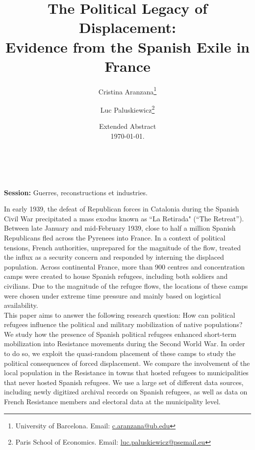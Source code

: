 





\title{\centering The Political Legacy of Displacement: \\ Evidence from the Spanish Exile in France}
\author{
Cristina Aranzana\footnote{University of Barcelona. Email: \href{mailto:c.aranzana@ub.edu}{c.aranzana@ub.edu}} \and
Luc Paluskiewicz\footnote{Paris School of Economics. Email: \href{mailto:luc.paluskiewicz@psemail.eu}{luc.paluskiewicz@psemail.eu}}
}

\date{Extended Abstract \\ \today. } 




\maketitle 

\\ 
\\
\vspace{0.1in}
\textbf{Session:} Guerres, reconstructions et industries. \\ 
\vspace{0.1in}

In early 1939, the defeat of Republican forces in Catalonia during the Spanish Civil War precipitated a mass exodus known as ``La Retirada" (``The Retreat”). Between late January and mid-February 1939, close to half a million Spanish Republicans fled across the Pyrenees into France. In a context of political tensions, French authorities, unprepared for the magnitude of the flow, treated the influx as a security concern and responded by interning the displaced population. Across continental France, more than 900 centres and concentration camps were created to house Spanish refugees, including both soldiers and civilians. Due to the magnitude of the refugee flows, the locations of these camps were chosen under extreme time pressure and mainly based on logistical availability. \\

This paper aims to answer the following research question: How can political refugees influence the political and military mobilization of native populations? We study how the presence of Spanish political refugees enhanced short-term mobilization into Resistance movements during the Second World War. In order to do so, we exploit the quasi-random placement of these camps to study the political consequences of forced displacement. We compare the involvement of the local population in the Resistance in towns that hosted refugees to municipalities that never hosted Spanish refugees. We use a large set of different data sources, including newly digitized archival records on Spanish refugees, as well as data on French Resistance members and electoral data at the municipality level. \\


